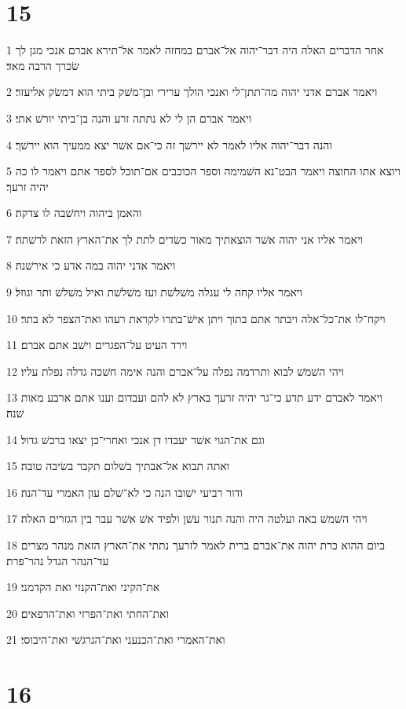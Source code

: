 \chapter{15}

\par 1 אחר הדברים האלה היה דבר־יהוה אל־אברם במחזה לאמר אל־תירא אברם אנכי מגן לך שׂכרך הרבה מאד׃
\par 2 ויאמר אברם אדני יהוה מה־תתן־לי ואנכי הולך ערירי ובן־משׁק ביתי הוא דמשׂק אליעזר׃
\par 3 ויאמר אברם הן לי לא נתתה זרע והנה בן־ביתי יורשׁ אתי׃
\par 4 והנה דבר־יהוה אליו לאמר לא יירשׁך זה כי־אם אשׁר יצא ממעיך הוא יירשׁך׃
\par 5 ויוצא אתו החוצה ויאמר הבט־נא השׁמימה וספר הכוכבים אם־תוכל לספר אתם ויאמר לו כה יהיה זרעך׃
\par 6 והאמן ביהוה ויחשׁבה לו צדקה׃
\par 7 ויאמר אליו אני יהוה אשׁר הוצאתיך מאור כשׂדים לתת לך את־הארץ הזאת לרשׁתה׃
\par 8 ויאמר אדני יהוה במה אדע כי אירשׁנה׃
\par 9 ויאמר אליו קחה לי עגלה משׁלשׁת ועז משׁלשׁת ואיל משׁלשׁ ותר וגוזל׃
\par 10 ויקח־לו את־כל־אלה ויבתר אתם בתוך ויתן אישׁ־בתרו לקראת רעהו ואת־הצפר לא בתר׃
\par 11 וירד העיט על־הפגרים וישׁב אתם אברם׃
\par 12 ויהי השׁמשׁ לבוא ותרדמה נפלה על־אברם והנה אימה חשׁכה גדלה נפלת עליו׃
\par 13 ויאמר לאברם ידע תדע כי־גר יהיה זרעך בארץ לא להם ועבדום וענו אתם ארבע מאות שׁנה׃
\par 14 וגם את־הגוי אשׁר יעבדו דן אנכי ואחרי־כן יצאו ברכשׁ גדול׃
\par 15 ואתה תבוא אל־אבתיך בשׁלום תקבר בשׂיבה טובה׃
\par 16 ודור רביעי ישׁובו הנה כי לא־שׁלם עון האמרי עד־הנה׃
\par 17 ויהי השׁמשׁ באה ועלטה היה והנה תנור עשׁן ולפיד אשׁ אשׁר עבר בין הגזרים האלה׃
\par 18 ביום ההוא כרת יהוה את־אברם ברית לאמר לזרעך נתתי את־הארץ הזאת מנהר מצרים עד־הנהר הגדל נהר־פרת׃
\par 19 את־הקיני ואת־הקנזי ואת הקדמני׃
\par 20 ואת־החתי ואת־הפרזי ואת־הרפאים׃
\par 21 ואת־האמרי ואת־הכנעני ואת־הגרגשׁי ואת־היבוסי׃

\chapter{16}

